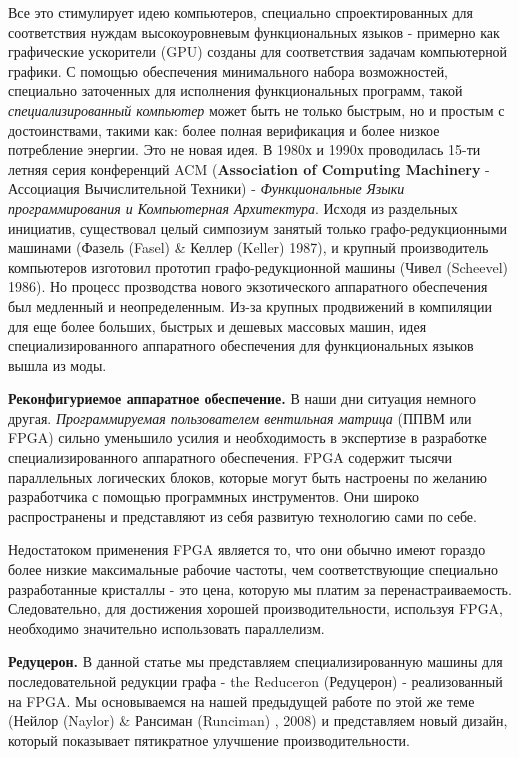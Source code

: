 \documentclass[flenqn, 14pt]{extarticle}
\begin{document}
Все это стимулирует идею компьютеров, специально спроектированных для соответствия нуждам высокоуровневым функциональных языков - примерно как графические ускорители (GPU) созданы для соответствия задачам компьютерной графики. С помощью обеспечения минимального набора возможностей, специально заточенных для исполнения функциональных программ, такой \textit{специализированный компьютер} может быть не только быстрым, но и простым с достоинствами, такими как: более полная верификация и более низкое потребление энергии. Это не новая идея. В 1980х и 1990х проводилась 15-ти летняя серия конференций ACM (\textbf{Association of Computing Machinery} - Ассоциация Вычислительной Техники) - \textit{Функциональные Языки программирования и Компьютерная Архитектура}. Исходя из раздельных инициатив, существовал целый симпозиум занятый только графо-редукционными машинами (Фазель (Fasel) \& Келлер (Keller) 1987), и крупный производитель компьютеров изготовил прототип графо-редукционной машины (Чивел (Scheevel) 1986). Но процесс прозводства нового экзотического аппаратного обеспечения был медленный и неопределенным. Из-за крупных продвижений в компиляции для еще более больших, быстрых и дешевых массовых машин, идея специализированного аппаратного обеспечения для функциональных языков вышла из моды.

\textbf{Реконфигуриемое аппаратное обеспечение.} В наши дни ситуация немного другая. \textit{Программируемая пользователем вентильная матрица} (ППВМ или FPGA) сильно уменьшило усилия и необходимость в экспертизе в разработке специализированного аппаратного обеспечения. FPGA содержит тысячи параллельных логических блоков, которые могут быть настроены по желанию разработчика с помощью программных инструментов. Они широко распространены и представляют из себя развитую технологию сами по себе. 

Недостатоком применения FPGA является то, что они обычно имеют гораздо более низкие максимальные рабочие частоты, чем соответствующие специально разработанные кристаллы - это цена, которую мы платим за перенастраиваемость. Следовательно, для достижения хорошей производительности, используя FPGA, необходимо значительно использовать параллелизм. 

\textbf{Редуцерон.} В данной статье мы представляем специализированную машины для последовательной редукции графа - the Reduceron  (Редуцерон) - реализованный на FPGA. Мы основываемся на нашей предыдущей работе по этой же теме (Нейлор (Naylor) \& Рансиман (Runciman) , 2008) и представляем новый дизайн, который показывает пятикратное улучшение производительности.
\end{document}
